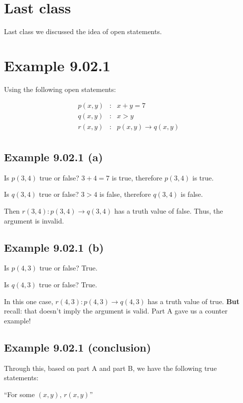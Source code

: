 \documentclass{article}
\begin{document}
\section*{Last class}

Last class we discussed the idea of open statements.

\section*{Example 9.02.1}

Using the following open statements:

\[
\begin{array}{rcl}
p(x,y) & : & x+y=7 \\
q(x,y) & : & x>y \\
r(x,y) & : & p(x,y)\rightarrow q(x,y) \\
\end{array}
\]

\subsection*{Example 9.02.1 (a)}

Is $p(3,4)$ true or false? $3+4=7$ is true, therefore $p(3,4)$ is
true.

Is $q(3,4)$ true or false? $3>4$ is false, therefore $q(3,4)$ is
false.

Then $r(3,4):p(3,4)\rightarrow{}q(3,4)$ has a truth value of false. Thus, the argument is invalid.

\subsection*{Example 9.02.1 (b)}

Is $p(4,3)$ true or false? True.

Is $q(4,3)$ true or false? True.

In this one case, $r(4,3):p(4,3)\rightarrow{}q(4,3)$ has a truth value
of true. \textbf{But} recall: that doesn't imply the argument is
valid. Part A gave us a counter example!

\subsection*{Example 9.02.1 (conclusion)}

Through this, based on part A and part B, we have the following true
statements:

``For some $(x,y)$, $r(x,y)$''
\end{document}

